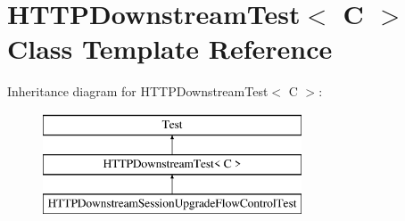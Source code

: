 \section{H\+T\+T\+P\+Downstream\+Test$<$ C $>$ Class Template Reference}
\label{classHTTPDownstreamTest}
Inheritance diagram for H\+T\+T\+P\+Downstream\+Test$<$ C $>$\+:\begin{figure}[H]
\begin{center}
\leavevmode
\includegraphics[height=3.000000cm]{classHTTPDownstreamTest}
\end{center}
\end{figure}
